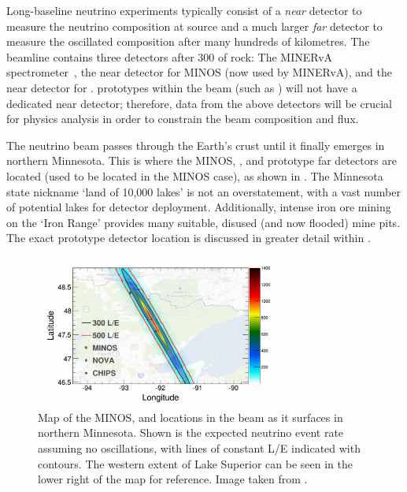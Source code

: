Long-baseline neutrino experiments typically consist of a \emph{near} detector to measure the
neutrino composition at source and a much larger \emph{far} detector to measure the oscillated
composition after many hundreds of kilometres. The \numi beamline contains three detectors after
\SI{300}{} of rock: The MINERvA spectrometer~\cite{mcfarland2006}, the near detector for
MINOS (now used by MINERvA), and the near detector for \nova. \chips prototypes within the \numi
beam (such as \chipsfive) will not have a dedicated near detector; therefore, data from the above
detectors will be crucial for physics analysis in order to constrain the beam composition and
flux.

The \numi neutrino beam passes through the Earth's crust until it finally emerges in northern
Minnesota. This is where the MINOS, \nova, and prototype \chips far detectors are located (used to
be located in the MINOS case), as shown in . The Minnesota state nickname
`land of 10,000 lakes' is not an overstatement, with a vast number of potential lakes for \chips
detector deployment. Additionally, intense iron ore mining on the `Iron Range' provides many
suitable, disused (and now flooded) mine pits. The exact \chipsfive prototype detector location is
discussed in greater detail within .

\begin{figure} %
    \includegraphics[width=0.7\textwidth]{diagrams/4-chips/numi_map.pdf}
    \caption[Map of detector locations in the \numi beam]
    {Map of the MINOS, \nova and \chips locations in the \numi beam as it surfaces in northern
        Minnesota. Shown is the expected neutrino event rate assuming no oscillations, with lines
        of constant L/E indicated with contours. The western extent of Lake Superior can be seen
        in the lower right of the map for reference. Image taken from .}
    \label{fig:numi_map}
\end{figure}

